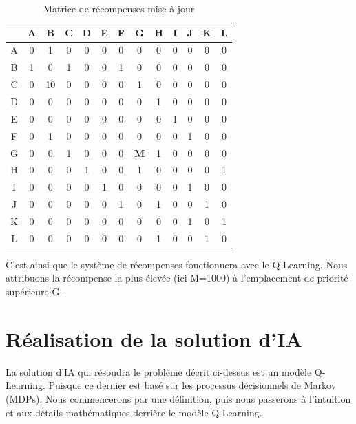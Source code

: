 \documentclass{article}
\begin{document}
\begin{table}[H]
    \centering
    \begin{tabular}{|c|c|c|c|c|c|c|c|c|c|c|c|c|}
        \hline
        & A & B & C & D & E & F & G & H & I & J & K & L \\
        \hline
        A & 0 & 1 & 0 & 0 & 0 & 0 & 0 & 0 & 0 & 0 & 0 & 0 \\
	\hline
        B & 1 & 0 & 1 & 0 & 0 & 1 & 0 & 0 & 0 & 0 & 0 & 0 \\
	\hline
        C & 0 & 10 & 0 & 0 & 0 & 0 & 1 & 0 & 0 & 0 & 0 & 0 \\
	\hline
        D & 0 & 0 & 0 & 0 & 0 & 0 & 0 & 1 & 0 & 0 & 0 & 0 \\
	\hline
        E & 0 & 0 & 0 & 0 & 0 & 0 & 0 & 0 & 1 & 0 & 0 & 0 \\
	\hline
        F & 0 & 1 & 0 & 0 & 0 & 0 & 0 & 0 & 0 & 1 & 0 & 0 \\
	\hline
        G & 0 & 0 & 1 & 0 & 0 & 0 & \textbf{M} & 1 & 0 & 0 & 0 & 0 \\
	\hline
        H & 0 & 0 & 0 & 1 & 0 & 0 & 1 & 0 & 0 & 0 & 0 & 1 \\
	\hline
        I & 0 & 0 & 0 & 0 & 1 & 0 & 0 & 0 & 0 & 1 & 0 & 0 \\
	\hline
        J & 0 & 0 & 0 & 0 & 0 & 1 & 0 & 1 & 0 & 0 & 1 & 0 \\
	\hline
        K & 0 & 0 & 0 & 0 & 0 & 0 & 0 & 0 & 0 & 1 & 0 & 1 \\
	\hline
        L & 0 & 0 & 0 & 0 & 0 & 0 & 0 & 1 & 0 & 0 & 1 & 0 \\
        \hline
    \end{tabular}
    \caption{Matrice de récompenses mise à jour}
\end{table}
C'est ainsi que le système de récompenses fonctionnera avec le Q-Learning. Nous attribuons la récompense la plus élevée (ici M=1000) à l'emplacement de priorité supérieure G. 

\section{Réalisation de la solution d'IA}
La solution d'IA qui résoudra le problème décrit ci-dessus est un modèle Q-Learning. Puisque ce dernier est basé sur les processus décisionnels de Markov (MDPs). Nous commencerons par une définition, puis nous passerons à l'intuition et aux détails mathématiques derrière le modèle Q-Learning.
\end{document}
